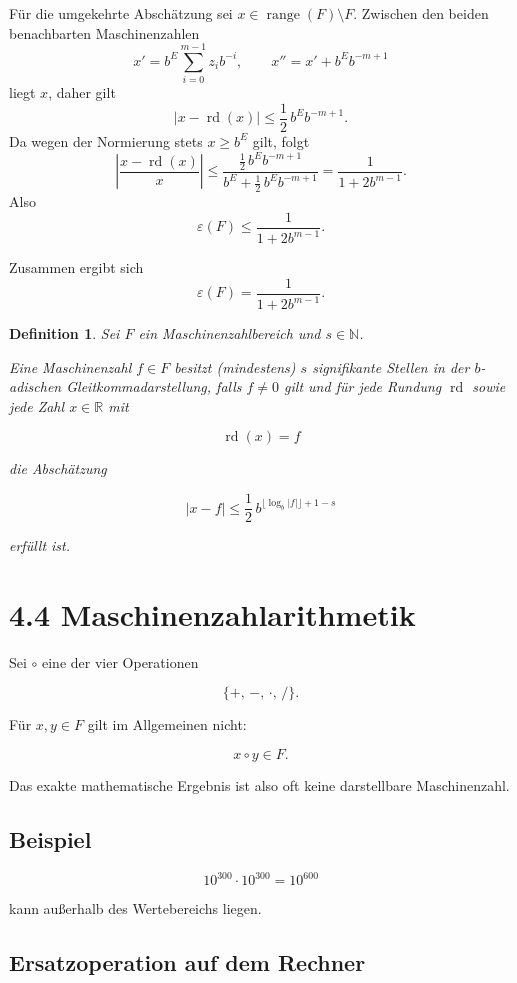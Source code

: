 \documentclass{article}
\newcommand{\R}{\mathbb{R}}%
\newcommand{\N}{\mathbb{N}}
\newtheorem{defn}[thm]{Definition}
\begin{document}
Für die umgekehrte Abschätzung sei \(x\in\operatorname{range}(F)\setminus F\). Zwischen den beiden benachbarten Maschinenzahlen
\[
x'=b^E\sum_{i=0}^{m-1} z_i b^{-i},
\qquad
x''=x'+b^Eb^{-m+1}
\]
liegt \(x\), daher gilt
\[
|x-\operatorname{rd}(x)|
\leq
\frac12\,b^Eb^{-m+1}.
\]
Da wegen der Normierung stets \(x\geq b^E\) gilt, folgt
\[
\left|\frac{x-\operatorname{rd}(x)}{x}\right|
\leq
\frac{\frac12\,b^Eb^{-m+1}}
{b^E+\frac12\,b^Eb^{-m+1}}
=
\frac{1}{1+2b^{m-1}}.
\]
Also
\[
\varepsilon(F)\leq \frac{1}{1+2b^{m-1}}.
\]

Zusammen ergibt sich
\[
\varepsilon(F)=\frac{1}{1+2b^{m-1}}.
\]

\begin{defn}
Sei \(F\) ein Maschinenzahlbereich und \(s\in\N\).

Eine Maschinenzahl \(f\in F\) besitzt (mindestens) \(s\) signifikante Stellen in der \(b\)-adischen Gleitkommadarstellung, falls \(f\neq 0\) gilt und für jede Rundung \(\operatorname{rd}\) sowie jede Zahl \(x\in\R\) mit

\[
\operatorname{rd}(x)=f
\]

die Abschätzung

\[
|x-f|
\leq
\frac12\, b^{\lfloor \log_b |f| \rfloor +1-s}
\]

erfüllt ist.
\end{defn}

\section{4.4 Maschinenzahlarithmetik}

Sei \( \circ \) eine der vier Operationen

\[
\{+,\,-,\,\cdot,\,/\}.
\]

Für \(x,y\in F\) gilt im Allgemeinen nicht:

\[
x\circ y \in F.
\]

Das exakte mathematische Ergebnis ist also oft keine darstellbare
Maschinenzahl.


\subsection*{Beispiel}

\[
10^{300}\cdot 10^{300}=10^{600}
\]

kann außerhalb des Wertebereichs liegen.

\subsection*{Ersatzoperation auf dem Rechner}
\end{document}
